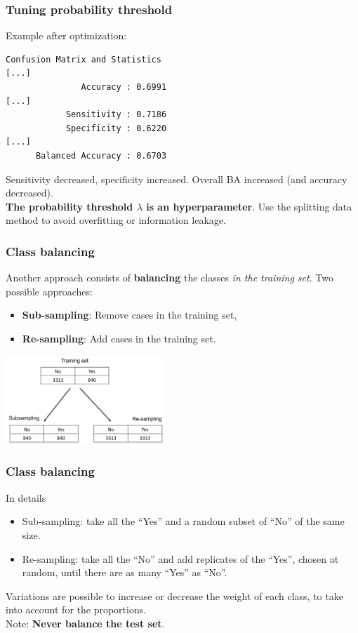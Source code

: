 \begin{frame}[fragile]
\frametitle{Tuning probability threshold}
Example after optimization:\\
\scriptsize
\begin{verbatim}
Confusion Matrix and Statistics
[...]                     
               Accuracy : 0.6991          
[...]
            Sensitivity : 0.7186          
            Specificity : 0.6220          
[...]
      Balanced Accuracy : 0.6703  
\end{verbatim}
\normalsize
Sensitivity decreased, specificity increased. Overall BA increased (and accuracy decreased).\\
\vspace{0.3cm}
{\bf The probability threshold $\lambda$ is an hyperparameter}. Use the splitting data method to avoid overfitting or information leakage.
\end{frame}
\begin{frame}
\frametitle{Class balancing}
Another approach consists of {\bf balancing} the classes {\it in the training set}. Two possible approaches:
\begin{itemize}
\item {\bf Sub-sampling}: Remove cases in the training set,
\item {\bf Re-sampling}: Add cases in the training set.
\end{itemize}
\begin{center}
\includegraphics[width=6cm]{../Graphs/Balancing.png}
\end{center}
\end{frame}
\begin{frame}
\frametitle{Class balancing}
In details
\begin{itemize}
\item Sub-sampling: take all the ``Yes'' and a random subset of ``No'' of the same size.
\item Re-sampling: take all the ``No'' and add replicates of the ``Yes'', chosen at random, until there are as many ``Yes'' as ``No''.
\end{itemize}
Variations are possible to increase or decrease the weight of each class, to take into account for the proportions.\\
\vspace{0.3cm}
Note: {\bf Never balance the test set}.
\end{frame}
